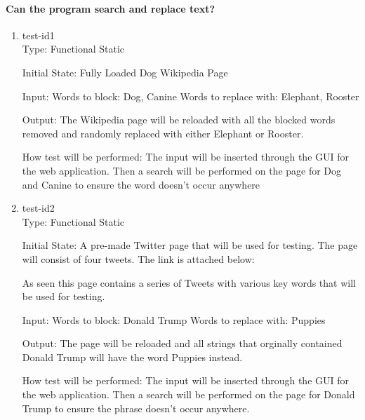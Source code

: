 \documentclass[12pt, titlepage]{article}
\begin{document}
\paragraph{Can the program search and replace text?}
\begin{enumerate}
\item{test-id1\\}
Type: Functional Static
					
Initial State: Fully Loaded Dog Wikipedia Page
					
Input: Words to block: Dog, Canine
Words to replace with: Elephant, Rooster
					
Output: The Wikipedia page will be reloaded with all the blocked words removed and randomly replaced with either Elephant or Rooster.
					
How test will be performed: The input will be inserted through the GUI for the web application. Then a search will be performed on the page for Dog and Canine to ensure the word doesn't occur anywhere
					
\item{test-id2\\}
Type: Functional Static
					
Initial State: A pre-made Twitter page that will be used for testing. The page will consist of four tweets. The link is attached below:

As seen this page contains a series of Tweets with various key words that will be used for testing.
					
Input:  Words to block: Donald Trump
Words to replace with: Puppies
					
Output: The page will be reloaded and all strings that orginally contained Donald Trump will have the word Puppies instead. 

How test will be performed: The input will be inserted through the GUI for the web application. Then a search will be performed on the page for Donald Trump to ensure the phrase doesn't occur anywhere.
\end{enumerate}
\end{document}
